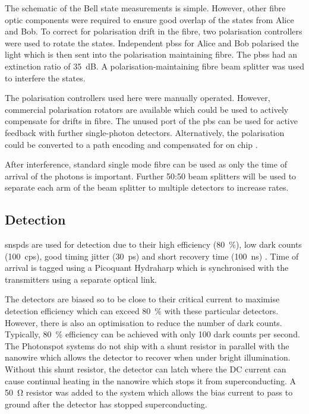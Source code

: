 The schematic of the Bell state measurements is simple. However, other fibre optic components were required to ensure good overlap of the states from Alice and Bob. To correct for polarisation drift in the fibre, two polarisation controllers were used to rotate the states. Independent \acp{pbs} for Alice and Bob polarised the light which is then sent into the polarisation maintaining fibre. The \acp{pbs} had an extinction ratio of \SI{35}{dB}. A polarisation-maintaining fibre beam splitter was used to interfere the states.

The polarisation controllers used here were manually operated. However, commercial polarisation rotators are available which could be used to actively compensate for drifts in fibre. The unused port of the \ac{pbs} can be used for active feedback with further single-photon detectors. Alternatively, the polarisation could be converted to a path encoding and compensated for on chip \cite{wang2016}.

After interference, standard single mode fibre can be used as only the time of arrival of the photons is important. Further {50:50} beam splitters will be used to separate each arm of the beam splitter to multiple detectors to increase rates. 



\subsection{Detection}

\Acsp{snspd} are used for detection due to their high efficiency (\SI{80}{\percent}), low dark counts (\SI{100}{cps}), good timing jitter (\SI{30}{ps}) and short recovery time (\SI{100}{ns}) \cite{hadfield2009single}. Time of arrival is tagged using a Picoquant Hydraharp which is synchronised with the transmitters using a separate optical link.

The detectors are biased so to be close to their critical current to maximise detection efficiency which can exceed \SI{80}{\percent} with these particular detectors. However, there is also an optimisation to reduce the number of dark counts. Typically, \SI{80}{\percent} efficiency can be achieved with only 100 dark counts per second. The Photonspot systems do not ship with a shunt resistor in parallel with the nanowire which allows the detector to recover when under bright illumination. Without this shunt resistor, the detector can latch where the DC current can cause continual heating in the nanowire which stops it from superconducting. A \SI{50}{\ohm} resistor was added to the system which allows the bias current to pass to ground after the detector has stopped superconducting. 

